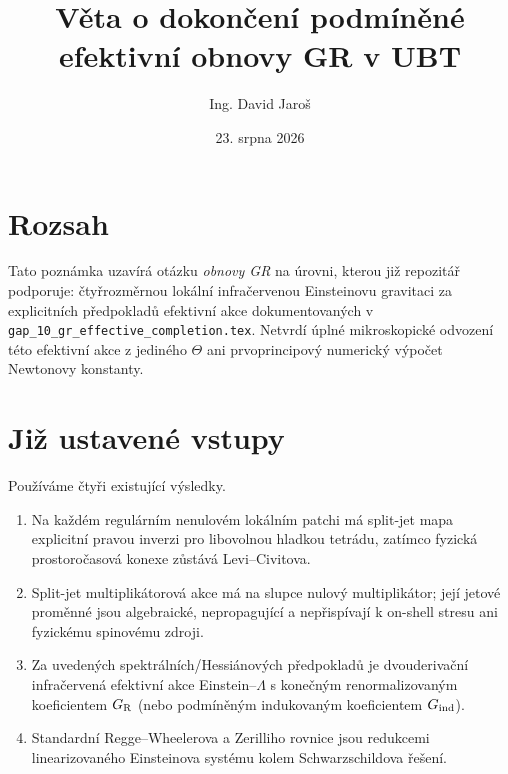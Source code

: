 \documentclass[11pt,a4paper]{article}
\title{Věta o dokončení podmíněné efektivní obnovy GR v UBT}
\author{Ing. David Jaro\v{s}}
\date{23. srpna 2026}
\begin{document}
\maketitle
\UBTProvenanceNotice

\section{Rozsah}
Tato poznámka uzavírá otázku \emph{obnovy GR} na úrovni, kterou již repozitář
podporuje: čtyřrozměrnou lokální infračervenou Einsteinovu gravitaci za
explicitních předpokladů efektivní akce dokumentovaných v
\texttt{gap\_10\_gr\_effective\_completion.tex}.  Netvrdí úplné mikroskopické
odvození této efektivní akce z jediného $\Theta$ ani prvoprincipový numerický
výpočet Newtonovy konstanty.

\section{Již ustavené vstupy}
Používáme čtyři existující výsledky.
\begin{enumerate}
\item Na každém regulárním nenulovém lokálním patchi má split-jet mapa
explicitní pravou inverzi pro libovolnou hladkou tetrádu, zatímco fyzická
prostoročasová konexe zůstává Levi--Civitova.
\item Split-jet multiplikátorová akce má na slupce nulový multiplikátor; její
jetové proměnné jsou algebraické, nepropagující a nepřispívají k on-shell
stresu ani fyzickému spinovému zdroji.
\item Za uvedených spektrálních/Hessiánových předpokladů je dvouderivační
infračervená efektivní akce Einstein--$\Lambda$ s konečným renormalizovaným
koeficientem $G_{\rm R}$ (nebo podmíněným indukovaným koeficientem
$G_{\rm ind}$).
\item Standardní Regge--Wheelerova a Zerilliho rovnice jsou redukcemi
linearizovaného Einsteinova systému kolem Schwarzschildova řešení.
\end{enumerate}

\end{document}
